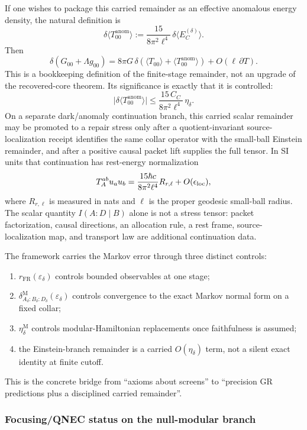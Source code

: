 If one wishes to package this carried remainder as an effective anomalous energy density, the natural definition is
\[
\delta\langle T_{00}^{\mathrm{anom}}\rangle
:=
\frac{15}{8\pi^2\ell^4}\,
\delta\langle E_C^{(\delta)}\rangle.
\]
Then
\[
\delta\!\left(G_{00}+\Lambda g_{00}\right)
=
8\pi G\,
\delta\!\left(
\langle T_{00}\rangle
+
\langle T_{00}^{\mathrm{anom}}\rangle
\right)
+
O(\ell\,\partial T).
\]
This is a bookkeeping definition of the finite-stage remainder, not an upgrade of the recovered-core theorem. Its significance is exactly that it is controlled:
\[
\bigl|
\delta\langle T_{00}^{\mathrm{anom}}\rangle
\bigr|
\le
\frac{15\,C_C}{8\pi^2\ell^4}\,
\eta_\delta.
\]
On a separate dark/anomaly continuation branch, this carried scalar remainder
may be promoted to a repair stress only after a quotient-invariant
source-localization receipt identifies the same collar operator with the
small-ball Einstein remainder, and after a positive causal packet lift supplies
the full tensor. In SI units that continuation has rest-energy normalization
\[
T_A^{ab}u_a u_b
=
\frac{15\hbar c}{8\pi^2\ell^4}R_{r,\ell}
+O(\epsilon_{\rm loc}),
\]
where \(R_{r,\ell}\) is measured in nats and \(\ell\) is the proper geodesic
small-ball radius. The scalar quantity \(I(A:D\mid B)\) alone is not a stress
tensor: packet factorization, causal directions, an allocation rule, a rest
frame, source-localization map, and transport law are additional continuation
data.

The framework carries the Markov error through three distinct controls:
\begin{enumerate}
\def\labelenumi{\arabic{enumi}.}
\tightlist
\item
\(r_{\mathrm{FR}}(\varepsilon_\delta)\) controls bounded observables at one stage;
\item
\(\delta^{\mathrm M}_{A_\delta:B_\delta:D_\delta}(\varepsilon_\delta)\) controls convergence to the exact Markov normal form on a fixed collar;
\item
\(\eta_\delta^{\mathrm M}\) controls modular-Hamiltonian replacements once faithfulness is assumed;
\item
the Einstein-branch remainder is a carried \(O(\eta_\delta)\) term, not a silent exact identity at finite cutoff.
\end{enumerate}

This is the concrete bridge from ``axioms about screens'' to ``precision GR predictions plus a disciplined carried remainder''.

\subsubsection{Focusing/QNEC status on the null-modular branch}\label{510-focusingqnec-internalization-via-relative-entropy}

